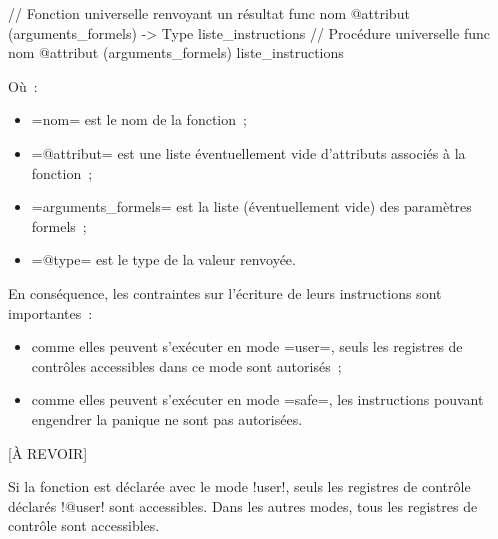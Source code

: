 \begin{OMNIBUS}
// Fonction universelle renvoyant un résultat
func nom @attribut (arguments_formels) -> Type {
  liste_instructions
}
// Procédure universelle
func nom @attribut (arguments_formels) {
  liste_instructions
}
\end{OMNIBUS}
Où~:
\begin{itemize}
  \item \omnibus=nom= est le nom de la fonction~;
  \item \omnibus=@attribut= est une liste éventuellement vide d'attributs associés à la fonction~;
  \item \omnibus=arguments_formels= est la liste (éventuellement vide) des paramètres formels~;
  \item \omnibus=@type= est le type de la valeur renvoyée.
\end{itemize}

En conséquence, les contraintes sur l'écriture de leurs instructions sont importantes~:
\begin{itemize}
  \item comme elles peuvent s'exécuter en mode \omnibus=user=, seuls les registres de contrôles accessibles dans ce mode sont autorisés~;
  \item comme elles peuvent s'exécuter en mode \omnibus=safe=, les instructions pouvant engendrer la panique ne sont pas autorisées.
\end{itemize}














[À REVOIR]

Si la fonction est déclarée avec le mode \omnibus!user!, seuls les registres de contrôle déclarés \omnibus!@user! sont accessibles. Dans les autres modes, tous les registres de contrôle sont accessibles.






















